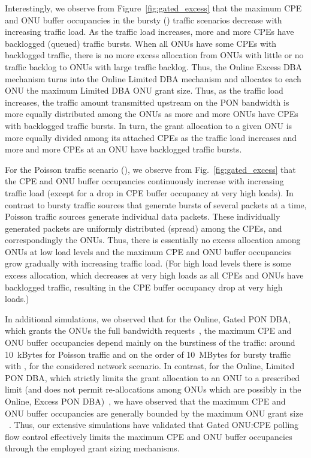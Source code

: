 \documentclass[pdftex,journal]{IEEEtran}
\begin{document}
Interestingly, we observe from Figure~\ref{fig:gated_excess} that
the maximum CPE and ONU buffer occupancies in the bursty
() traffic scenarios decrease with increasing
traffic load.
As the traffic load increases, more and more CPEs
have backlogged (queued) traffic bursts.
When all ONUs have some CPEs with backlogged traffic, there is no more
excess allocation from ONUs with little or no traffic backlog to
ONUs with large traffic backlog.
Thus, the Online Excess DBA mechanism turns into the Online Limited DBA
mechanism and allocates to each ONU the maximum Limited DBA ONU grant size.
Thus, as the traffic load increases, the traffic amount
transmitted upstream on the PON bandwidth is more equally distributed among
the ONUs as more and more ONUs have CPEs with backlogged traffic bursts.
In turn, the grant allocation to a given ONU is more
equally divided among its attached CPEs as the
traffic load increases and more and more CPEs at an ONU have backlogged
traffic bursts.

For the Poisson traffic scenario (), we observe from
Fig.~\ref{fig:gated_excess} that the CPE and ONU buffer occupancies
continuously increase with increasing traffic load (except for a
drop in CPE buffer occupancy at very high loads). In contrast to
bursty traffic sources that generate bursts of several packets at a
time, Poisson traffic sources generate individual data packets.
These individually generated packets are uniformly distributed
(spread) among the CPEs, and correspondingly the ONUs. Thus, there
is essentially no excess allocation among ONUs at low load levels
and the maximum CPE and ONU buffer occupancies grow gradually with
increasing traffic load. (For high load levels there is some excess
allocation, which decreases at very high loads as all CPEs and ONUs
have backlogged traffic, resulting in the CPE buffer occupancy drop
at very high loads.)

In additional simulations, we observed that for the Online, Gated PON DBA,
which grants the ONUs the full bandwidth requests~\cite{ZM0709},
the maximum CPE and ONU buffer occupancies depend mainly on the burstiness
of the traffic: around 10~kBytes for Poisson traffic and
on the order of 10~MBytes  for bursty traffic with ,
for the considered network scenario.
In contrast, for the Online, Limited PON DBA, which strictly
limits the grant allocation to an ONU to a prescribed limit 
(and does not permit re-allocations among ONUs which are
possibly in the Online, Excess PON DBA)~\cite{ZM0709},
we have observed that the maximum CPE and ONU buffer occupancies
are generally bounded by the maximum ONU grant size
~\cite{MGMR1115}.
Thus, our extensive simulations have validated that Gated ONU:CPE polling
flow control effectively limits the maximum CPE and ONU buffer occupancies
through the employed grant sizing mechanisms.
\end{document}
